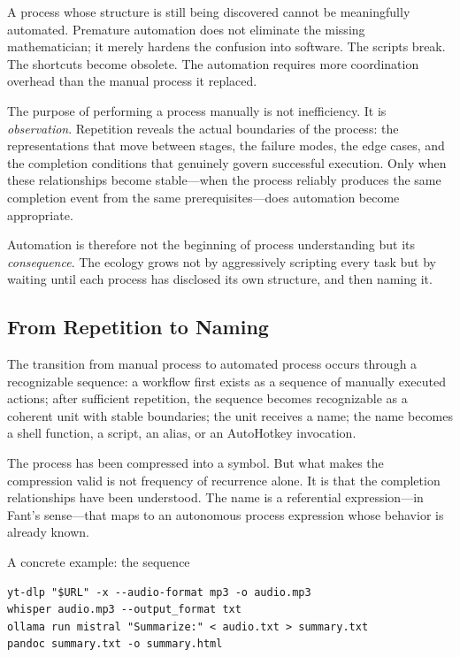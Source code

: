 \documentclass[12pt, a4paper]{article}
\begin{document}
A process whose structure is still being discovered cannot be
meaningfully automated. Premature automation does not eliminate the
missing mathematician; it merely hardens the confusion into software.
The scripts break. The shortcuts become obsolete. The automation
requires more coordination overhead than the manual process it
replaced.

The purpose of performing a process manually is not inefficiency.
It is \emph{observation}. Repetition reveals the actual boundaries
of the process: the representations that move between stages, the
failure modes, the edge cases, and the completion conditions that
genuinely govern successful execution. Only when these relationships
become stable---when the process reliably produces the same
completion event from the same prerequisites---does automation
become appropriate.

Automation is therefore not the beginning of process understanding
but its \emph{consequence}. The ecology grows not by aggressively
scripting every task but by waiting until each process has disclosed
its own structure, and then naming it.

\subsection{From Repetition to Naming}

The transition from manual process to automated process occurs
through a recognizable sequence: a workflow first exists as a
sequence of manually executed actions; after sufficient repetition,
the sequence becomes recognizable as a coherent unit with stable
boundaries; the unit receives a name; the name becomes a shell
function, a script, an alias, or an AutoHotkey invocation.

The process has been compressed into a symbol. But what makes
the compression valid is not frequency of recurrence alone. It is
that the completion relationships have been understood. The name
is a referential expression---in Fant's sense---that maps to an
autonomous process expression whose behavior is already known.

A concrete example: the sequence

\begin{lstlisting}
yt-dlp "$URL" -x --audio-format mp3 -o audio.mp3
whisper audio.mp3 --output_format txt
ollama run mistral "Summarize:" < audio.txt > summary.txt
pandoc summary.txt -o summary.html
\end{lstlisting}
\end{document}
